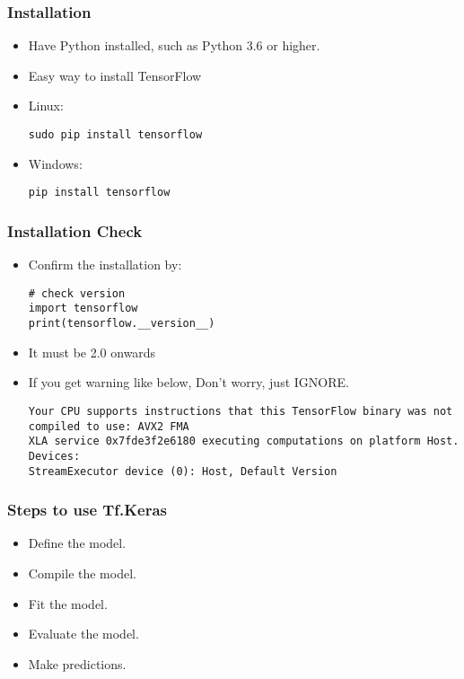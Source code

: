 \begin{frame}[fragile] \frametitle{Installation}

\begin{itemize}
\item Have Python installed, such as Python 3.6 or higher.
\item Easy way to install TensorFlow
\item Linux:
\begin{lstlisting}
sudo pip install tensorflow
\end{lstlisting}
\item Windows:
\begin{lstlisting}
pip install tensorflow
\end{lstlisting}
\end{itemize}

\end{frame}

\begin{frame}[fragile] \frametitle{Installation Check}

\begin{itemize}
\item Confirm the installation by:
\begin{lstlisting}
# check version
import tensorflow
print(tensorflow.__version__)
\end{lstlisting}
\item It must be 2.0 onwards
\item If you get warning like below, Don't worry, just IGNORE.
\begin{lstlisting}
Your CPU supports instructions that this TensorFlow binary was not compiled to use: AVX2 FMA
XLA service 0x7fde3f2e6180 executing computations on platform Host. Devices:
StreamExecutor device (0): Host, Default Version
\end{lstlisting}

\end{itemize}

\end{frame}

\begin{frame}[fragile] \frametitle{Steps to use Tf.Keras}

\begin{itemize}
\item  Define the model.
\item  Compile the model.
\item  Fit the model.
\item  Evaluate the model.
\item  Make predictions.
\end{itemize}
\end{frame}

